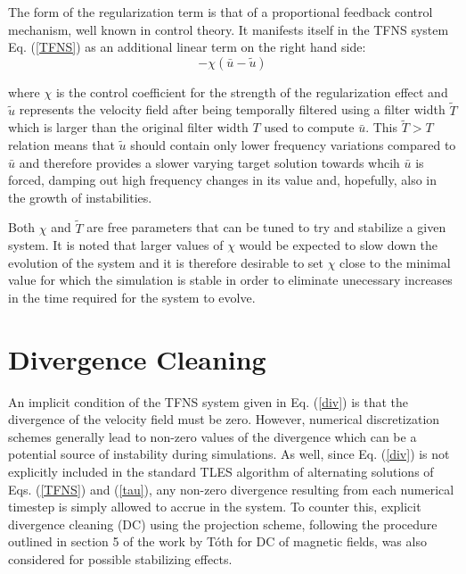 The form of the regularization term is that of a proportional feedback control mechanism, well known in control theory. It manifests itself in the TFNS system Eq. (\ref{TFNS}) as an additional linear term on the right hand side:
\begin{equation} \label{eq:reg}
-\chi(\bar{u}-\tilde{u})
\end{equation}

where $\chi$ is the control coefficient for the strength of the regularization effect and $\tilde{u}$ represents the velocity field after being temporally filtered using a filter width $\tilde{T}$ which is larger than the original filter width $T$ used to compute $\bar{u}$. This $\tilde{T}>T$ relation means that $\tilde{u}$ should contain only lower frequency variations compared to $\bar{u}$ and therefore provides a slower varying target solution towards whcih $\bar{u}$ is forced, damping out high frequency changes in its value and, hopefully, also in the growth of instabilities.

Both $\chi$ and $\tilde{T}$ are free parameters that can be tuned to try and stabilize a given system. It is noted that larger values of $\chi$ would be expected to slow down the evolution of the system and it is therefore desirable to set $\chi$ close to the minimal value for which the simulation is stable in order to eliminate unecessary increases in the time required for the system to evolve.

\section{Divergence Cleaning} \label{sec:DC}

An implicit condition of the TFNS system given in Eq. (\ref{div}) is that the divergence of the velocity field must be zero. However, numerical discretization schemes generally lead to non-zero values of the divergence which can be a potential source of instability during simulations. As well, since Eq. (\ref{div}) is not explicitly included in the standard TLES algorithm of alternating solutions of Eqs. (\ref{TFNS}) and (\ref{tau}), any non-zero divergence resulting from each numerical timestep is simply allowed to accrue in the system. To counter this, explicit divergence cleaning (DC) using the projection scheme, following the procedure outlined in section 5 of the work by T\'oth \cite{Toth2000} for DC of magnetic fields, was also considered for possible stabilizing effects.

